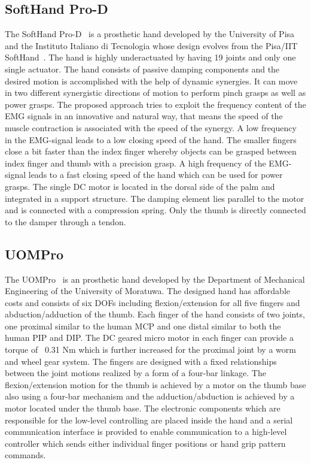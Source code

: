 \documentclass[a4paper, 10pt, conference]{ieeeconf}      %
\begin{document}
\subsection{SoftHand Pro-D}

The SoftHand Pro-D~\cite{softhand} is a prosthetic hand developed by the University of Pisa and the Instituto Italiano di Tecnologia whose design evolves from the Pisa/IIT SoftHand~\cite{pisahand}. The hand is highly underactuated by having 19 joints and only one single actuator. The hand consists of passive damping components and the desired motion is accomplished with the help of dynamic synergies. It can move in two different synergistic directions of motion to perform pinch grasps as well as power grasps. The proposed approach tries to exploit the frequency content of the EMG signals in an innovative and natural way, that means the speed of the muscle contraction is associated with the speed of the synergy. A low frequency in the EMG-signal leads to a low closing speed of the hand. The smaller fingers close a bit faster than the index finger whereby objects can be grasped between index finger and thumb with a precision grasp. A high frequency of the EMG-signal leads to a fast closing speed of the hand which can be used for power grasps. The single DC motor is located in the dorsal side of the palm and integrated in a support structure. The damping element lies parallel to the motor and is connected with a compression spring. Only the thumb is directly connected to the damper through a tendon.


\subsection{UOMPro}

The UOMPro~\cite{uompro} is an prosthetic hand developed by the Department of Mechanical Engineering of the University of Moratuwa. The designed hand has affordable costs and consists of six DOFs including flexion/extension for all five fingers and abduction/adduction of the thumb. Each finger of the hand consists of two joints, one proximal similar to the human MCP and one distal similar to both the human PIP and DIP. The DC geared micro motor in each finger can provide a torque of ~0.31 Nm which is further increased for the proximal joint by a worm and wheel gear system. The fingers are designed with a fixed relationships between the joint motions realized by a form of a four-bar linkage. The flexion/extension motion for the thumb is achieved by a motor on the thumb base also using a four-bar mechanism and the adduction/abduction is achieved by a motor located under the thumb base. The electronic components which are responsible for the low-level controlling are placed inside the hand and a serial communication interface is provided to enable communication to a high-level controller which sends either individual finger positions or hand grip pattern commands.
\end{document}
